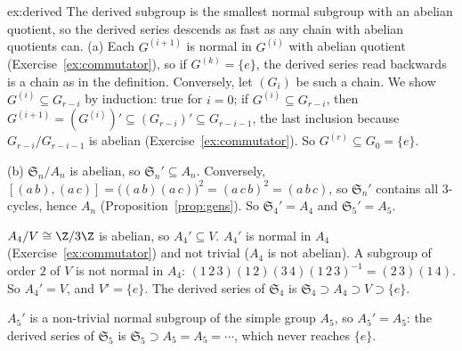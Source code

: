 \begin{solution}{ex:derived}
\idea The derived subgroup is the smallest normal subgroup with an abelian quotient, so the derived series descends as fast as any chain with abelian quotients can.
\writeup (a) Each $G^{(i+1)}$ is normal in $G^{(i)}$ with abelian quotient (Exercise~\ref{ex:commutator}), so if $G^{(k)}=\{e\}$, the derived series read backwards is a chain as in the definition. Conversely, let $(G_i)$ be such a chain. We show $G^{(i)}\subseteq G_{r-i}$ by induction: true for $i=0$; if $G^{(i)}\subseteq G_{r-i}$, then $G^{(i+1)}=(G^{(i)})'\subseteq(G_{r-i})'\subseteq G_{r-i-1}$, the last inclusion because $G_{r-i}/G_{r-i-1}$ is abelian (Exercise~\ref{ex:commutator}). So $G^{(r)}\subseteq G_0=\{e\}$.

(b) $\mathfrak S_n/A_n$ is abelian, so $\mathfrak S_n'\subseteq A_n$. Conversely, $[(a\,b),(a\,c)]=\bigl((a\,b)(a\,c)\bigr)^2=(a\,c\,b)^2=(a\,b\,c)$, so $\mathfrak S_n'$ contains all $3$-cycles, hence $A_n$ (Proposition~\ref{prop:gens}). So $\mathfrak S_4'=A_4$ and $\mathfrak S_5'=A_5$.

$A_4/V\cong\Z/3\Z$ is abelian, so $A_4'\subseteq V$. $A_4'$ is normal in $A_4$ (Exercise~\ref{ex:commutator}) and not trivial ($A_4$ is not abelian). A subgroup of order $2$ of $V$ is not normal in $A_4$: $(1\,2\,3)(1\,2)(3\,4)(1\,2\,3)^{-1}=(2\,3)(1\,4)$. So $A_4'=V$, and $V'=\{e\}$. The derived series of $\mathfrak S_4$ is $\mathfrak S_4\supset A_4\supset V\supset\{e\}$.

$A_5'$ is a non-trivial normal subgroup of the simple group $A_5$, so $A_5'=A_5$: the derived series of $\mathfrak S_5$ is $\mathfrak S_5\supset A_5=A_5=\cdots$, which never reaches $\{e\}$.
\end{solution}

